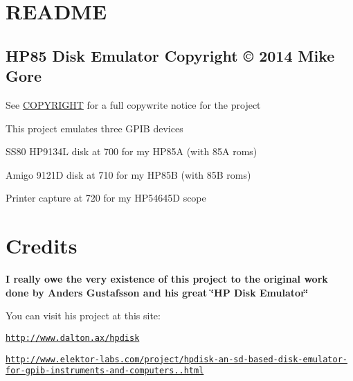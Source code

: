 \hypertarget{md_README_README}{}\section{R\-E\-A\-D\-M\-E}\label{md_README_README}
\subsection*{H\-P85 Disk Emulator Copyright \copyright{} 2014 Mike Gore}


\begin{DoxyItemize}
\item See \hyperlink{md_COPYRIGHT}{C\-O\-P\-Y\-R\-I\-G\-H\-T} for a full copywrite notice for the project
\end{DoxyItemize}

This project emulates three G\-P\-I\-B devices
\begin{DoxyItemize}
\item S\-S80 H\-P9134\-L disk at 700 for my H\-P85\-A (with 85\-A roms)
\item Amigo 9121\-D disk at 710 for my H\-P85\-B (with 85\-B roms)
\item Printer capture at 720 for my H\-P54645\-D scope
\end{DoxyItemize}





\section*{Credits}

{\bfseries I really owe the very existence of this project to the original work done by Anders Gustafsson and his great \char`\"{}\-H\-P Disk Emulator\char`\"{} }
\begin{DoxyItemize}
\item You can visit his project at this site\-:
\begin{DoxyItemize}
\item \href{http://www.dalton.ax/hpdisk}{\tt http\-://www.\-dalton.\-ax/hpdisk}
\item \href{http://www.elektor-labs.com/project/hpdisk-an-sd-based-disk-emulator-for-gpib-instruments-and-computers.13693.html}{\tt http\-://www.\-elektor-\/labs.\-com/project/hpdisk-\/an-\/sd-\/based-\/disk-\/emulator-\/for-\/gpib-\/instruments-\/and-\/computers..\-html}
\end{DoxyItemize}
\end{DoxyItemize}

